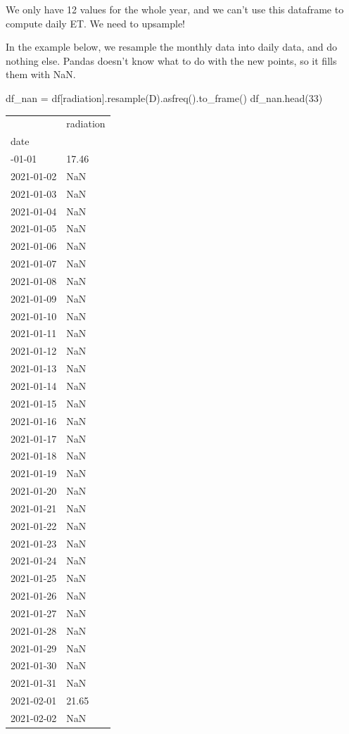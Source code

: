 \documentclass[
  letterpaper,
  DIV=11,
  numbers=noendperiod,
  oneside]{scrreprt}
\newenvironment{Shaded}{\begin{snugshade}}{\end{snugshade}}
\newcommand{\DecValTok}[1]{\textcolor[rgb]{0.68,0.00,0.00}{#1}}
\newcommand{\NormalTok}[1]{\textcolor[rgb]{0.00,0.23,0.31}{#1}}
\newcommand{\OperatorTok}[1]{\textcolor[rgb]{0.37,0.37,0.37}{#1}}
\newcommand{\StringTok}[1]{\textcolor[rgb]{0.13,0.47,0.30}{#1}}
\begin{document}
We only have 12 values for the whole year, and we can't use this
dataframe to compute daily ET. We need to upsample!

In the example below, we resample the monthly data into daily data, and
do nothing else. Pandas doesn't know what to do with the new points, so
it fills them with NaN.

\begin{Shaded}
\begin{Highlighting}[]
\NormalTok{df\_nan }\OperatorTok{=}\NormalTok{ df[}\StringTok{\textquotesingle{}radiation\textquotesingle{}}\NormalTok{].resample(}\StringTok{\textquotesingle{}D\textquotesingle{}}\NormalTok{).asfreq().to\_frame()}
\NormalTok{df\_nan.head(}\DecValTok{33}\NormalTok{)}
\end{Highlighting}
\end{Shaded}

\begin{longtable}[]{@{}ll@{}}
\toprule\noalign{}
& radiation \\
date & \\
\midrule\noalign{}
\endhead
\bottomrule\noalign{}
\endlastfoot
2021-01-01 & 17.46 \\
2021-01-02 & NaN \\
2021-01-03 & NaN \\
2021-01-04 & NaN \\
2021-01-05 & NaN \\
2021-01-06 & NaN \\
2021-01-07 & NaN \\
2021-01-08 & NaN \\
2021-01-09 & NaN \\
2021-01-10 & NaN \\
2021-01-11 & NaN \\
2021-01-12 & NaN \\
2021-01-13 & NaN \\
2021-01-14 & NaN \\
2021-01-15 & NaN \\
2021-01-16 & NaN \\
2021-01-17 & NaN \\
2021-01-18 & NaN \\
2021-01-19 & NaN \\
2021-01-20 & NaN \\
2021-01-21 & NaN \\
2021-01-22 & NaN \\
2021-01-23 & NaN \\
2021-01-24 & NaN \\
2021-01-25 & NaN \\
2021-01-26 & NaN \\
2021-01-27 & NaN \\
2021-01-28 & NaN \\
2021-01-29 & NaN \\
2021-01-30 & NaN \\
2021-01-31 & NaN \\
2021-02-01 & 21.65 \\
2021-02-02 & NaN \\
\end{longtable}
\end{document}
